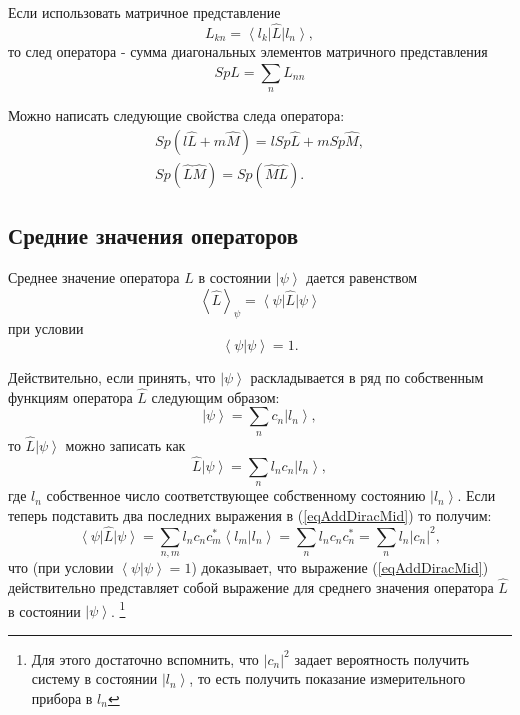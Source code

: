 Если использовать матричное представление 
\[
L_{kn} = \left<l_k\right| \hat{L} \left|l_n\right>, 
\]
то след оператора - сумма диагональных элементов матричного 
представления
\[
Sp \hat{L} = \sum_n L_{nn}
\]

Можно написать следующие свойства следа оператора:
\begin{eqnarray}
Sp\left(l \hat{L} + m \hat{M}\right) = 
l Sp \hat{L} + m Sp \hat{M},
\nonumber \\
Sp\left(\hat{L}\hat{M}\right) = 
Sp\left(\hat{M}\hat{L}\right).
\label{eqAddDiracTrProperty}
\end{eqnarray}

\subsection{Средние  значения  операторов}
Среднее значение оператора $\hat{L}$   в состоянии $\left| \psi
\right>$  дается равенством 
\begin{equation}  
\left< \hat{L} \right>_{\psi} = \left<\psi\right|\hat{L}\left|\psi\right>
\label{eqAddDiracMid}
\end{equation}  
при условии
\[
\left<\psi\right.\left|\psi\right> = 1.
\]

Действительно, если принять, что $\left|\psi\right>$ раскладывается в
ряд по собственным функциям оператора $\hat{L}$ следующим образом:
\[
\left|\psi\right> = \sum_n c_n \left|l_n\right>,
\]
то $\hat{L}\left|\psi\right>$ можно записать как
\[
\hat{L}\left|\psi\right> = \sum_n l_n c_n \left|l_n\right>,
\]
где $l_n$ собственное число соответствующее собственному состоянию 
$\left|l_n\right>$. 
Если теперь подставить два последних выражения в (\ref{eqAddDiracMid})
то получим:
\[
\left<\psi\right|\hat{L}\left|\psi\right> = \sum_{n,m} 
l_n c_n c_m^{*} \left<l_m\right. \left|l_n\right>=
\sum_n l_n c_n c_n^{*} = 
\sum_n l_n \left|c_n\right|^2, 
\]
что (при условии $\left<\psi\right.\left|\psi\right> = 1$) доказывает,
что выражение (\ref{eqAddDiracMid}) действительно 
представляет собой выражение для среднего значения оператора 
$\hat{L}$   в состоянии $\left|\psi\right>$.
\footnote{Для этого достаточно вспомнить, что $\left|c_n\right|^2$
  задает вероятность получить систему в состоянии $\left|l_n\right>$,
  то есть получить показание измерительного прибора в $l_n$}

